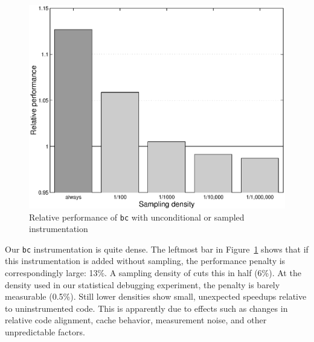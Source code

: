 \begin{figure}
  \centering
  \small
  \includegraphics[width=\columnwidth]{applications/bc_density}
  \caption{Relative performance of \texttt{bc} with unconditional or
    sampled instrumentation}
  \label{fig:bc:slowdown}
\end{figure}

Our \texttt{bc} instrumentation is quite dense.  The leftmost bar in
Figure~\ref{fig:bc:slowdown} shows that if this instrumentation is
added without sampling, the performance penalty is correspondingly
large: 13\%.  A sampling density of  cuts this in
half (6\%).  At the  density used in our statistical
debugging experiment, the penalty is barely measurable (0.5\%).  Still
lower densities show small, unexpected speedups relative to
uninstrumented code.  This is apparently due to effects such as
changes in relative code alignment, cache behavior, measurement noise,
and other unpredictable factors.  


